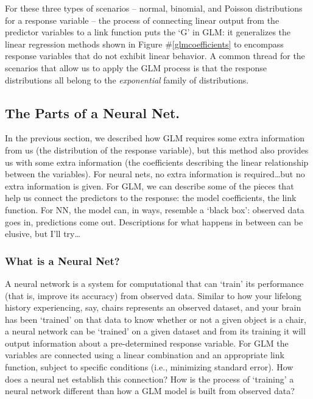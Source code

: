 \documentclass[12pt]{article}
\begin{document}
For these three types of scenarios -- normal, binomial, and Poisson distributions for a response variable -- the process of connecting linear 
output from the predictor variables to a link function puts the `G' in GLM:  it generalizes the linear regression methods shown in Figure \#\ref{glmcoefficients} to
encompass response variables that do not exhibit linear behavior.  A common thread for the scenarios that allow us to apply the GLM process is that the 
response distributions all belong to the \textit{exponential} family of distributions.

\subsection{The Parts of a Neural Net.}

In the previous section, we described how GLM requires some extra information from us (the distribution of the response variable), but this method
also provides us with some extra information (the coefficients describing the linear relationship between the variables).  For neural nets, no 
extra information is required\dots but no extra information is given.  For GLM, we can describe some of the pieces that help us connect the 
predictors to the response:  the model coefficients, the link function.  For NN, the model can, in ways, resemble a `black box':  observed data
goes in, predictions come out.  Descriptions for what happens in between can be elusive, but I'll try\dots

\subsubsection{What is a Neural Net?}
A neural network is a system for computational that can `train' its performance (that is, improve its accuracy) from observed data.  Similar to how your lifelong history experiencing, say, chairs represents an observed dataset, and your brain has been `trained' on that data to know whether or not a given object is a chair,  a neural network can be `trained' on a given dataset and from its training it will output information about a pre-determined response variable.   For GLM the variables are connected using a linear combination and an appropriate link function, subject to specific conditions (i.e., minimizing standard error).  How does a neural net establish this connection?  How is the process of `training' a neural network different than how a GLM model is built from observed data?  
\end{document}
